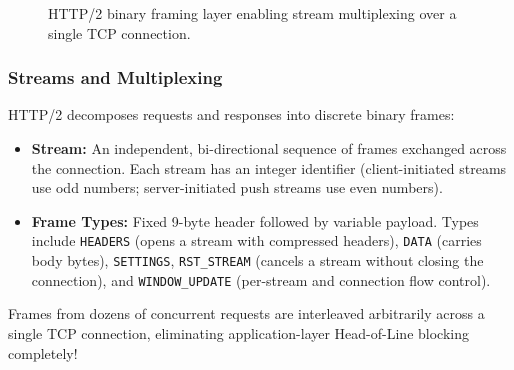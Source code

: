 \begin{figure}[htbp]
\centering
{}
\caption{HTTP/2 binary framing layer enabling stream multiplexing over a single TCP connection.}
\label{fig:http2-framing}
\end{figure}

\subsubsection{Streams and Multiplexing}
HTTP/2 decomposes requests and responses into discrete binary frames:
\begin{itemize}[leftmargin=15pt]
  \item \textbf{Stream:} An independent, bi-directional sequence of frames exchanged across the connection. Each stream has an integer identifier (client-initiated streams use odd numbers; server-initiated push streams use even numbers).
  \item \textbf{Frame Types:} Fixed 9-byte header followed by variable payload. Types include \texttt{HEADERS} (opens a stream with compressed headers), \texttt{DATA} (carries body bytes), \texttt{SETTINGS}, \texttt{RST\_STREAM} (cancels a stream without closing the connection), and \texttt{WINDOW\_UPDATE} (per-stream and connection flow control).
\end{itemize}

Frames from dozens of concurrent requests are interleaved arbitrarily across a single TCP connection, eliminating application-layer Head-of-Line blocking completely!

